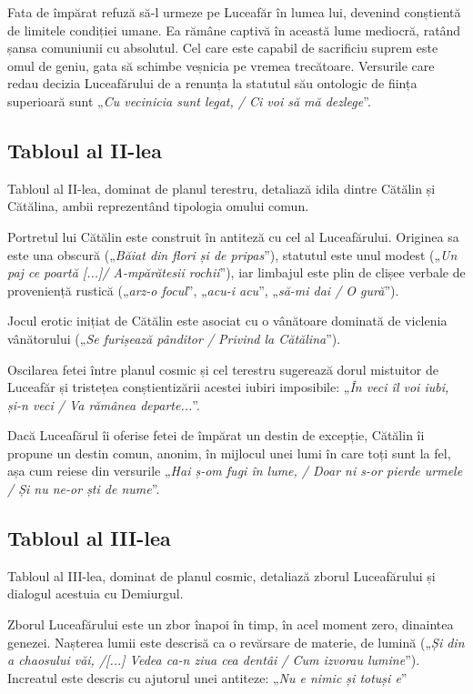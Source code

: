 \documentclass{article}
\newcommand{\qu}[1]{„\emph{#1}”}
\begin{document}
Fata de împărat refuză să-l urmeze pe Luceafăr în lumea lui, devenind conștientă de limitele condiției umane. Ea rămâne captivă în această lume mediocră, ratând șansa comuniunii cu absolutul. Cel care este capabil de sacrificiu suprem este omul de geniu, gata să schimbe veșnicia pe vremea trecătoare. Versurile care redau decizia Luceafărului de a renunța la statutul său ontologic de ființa superioară sunt \qu{Cu vecinicia sunt legat, / Ci voi să mă dezlege}.
\subsection{Tabloul al II-lea}
Tabloul al II-lea, dominat de planul terestru, detaliază idila dintre Cătălin și Cătălina, ambii reprezentând tipologia omului comun.

Portretul lui Cătălin este construit în antiteză cu cel al Luceafărului. Originea sa este una obscură (\qu{Băiat din flori și de pripas}), statutul este unul modest (\qu{Un paj ce poartă [...]/ A-mpărătesii rochii}), iar limbajul este plin de clișee verbale de proveniență rustică (\qu{arz-o focul}, \qu{acu-i acu}, \qu{să-mi dai / O gură}).

Jocul erotic inițiat de Cătălin este asociat cu o vânătoare dominată de viclenia vânătorului (\qu{Se furișează pânditor / Privind la Cătălina}).

Oscilarea fetei între planul cosmic și cel terestru sugerează dorul mistuitor de Luceafăr și tristețea conștientizării acestei iubiri imposibile: \qu{În veci îl voi iubi, și-n veci / Va rămânea departe...}.

Dacă Luceafărul îi oferise fetei de împărat un destin de excepție, Cătălin îi propune un destin comun, anonim, în mijlocul unei lumi în care toți sunt la fel, așa cum reiese din versurile \qu{Hai ș-om fugi în lume, / Doar ni s-or pierde urmele / Și nu ne-or ști de nume}.

\subsection{Tabloul al III-lea}
Tabloul al III-lea, dominat de planul cosmic, detaliază zborul Luceafărului și dialogul acestuia cu Demiurgul.

Zborul Luceafărului este un zbor înapoi în timp, în acel moment zero, dinaintea genezei. Nașterea lumii este descrisă ca o revărsare de materie, de lumină (\qu{Și din a chaosului văi, /[...] Vedea ca-n ziua cea dentâi / Cum izvorau lumine}). Increatul este descris cu ajutorul unei antiteze: \qu{Nu e nimic și totuși e}
\end{document}
